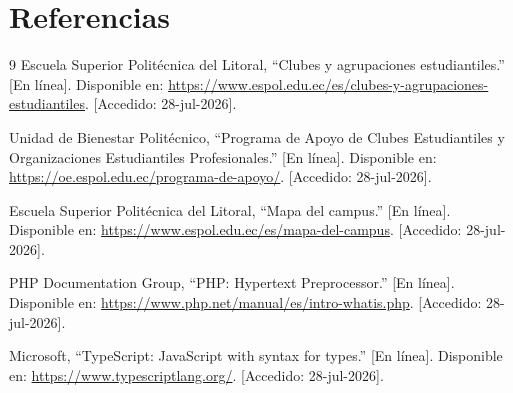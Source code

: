 \documentclass[12pt]{article}
\begin{document}
\section{Referencias}
\begin{thebibliography}{9}
 Escuela Superior Politécnica del Litoral, ``Clubes y agrupaciones estudiantiles.'' [En línea]. Disponible en: \url{https://www.espol.edu.ec/es/clubes-y-agrupaciones-estudiantiles}. [Accedido: 28-jul-2026].

 Unidad de Bienestar Politécnico, ``Programa de Apoyo de Clubes Estudiantiles y Organizaciones Estudiantiles Profesionales.'' [En línea]. Disponible en: \url{https://oe.espol.edu.ec/programa-de-apoyo/}. [Accedido: 28-jul-2026].

 Escuela Superior Politécnica del Litoral, ``Mapa del campus.'' [En línea]. Disponible en: \url{https://www.espol.edu.ec/es/mapa-del-campus}. [Accedido: 28-jul-2026].

 PHP Documentation Group, ``PHP: Hypertext Preprocessor.'' [En línea]. Disponible en: \url{https://www.php.net/manual/es/intro-whatis.php}. [Accedido: 28-jul-2026].

 Microsoft, ``TypeScript: JavaScript with syntax for types.'' [En línea]. Disponible en: \url{https://www.typescriptlang.org/}. [Accedido: 28-jul-2026].
\end{thebibliography}
\end{document}
